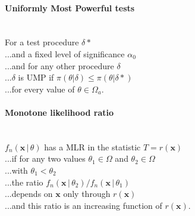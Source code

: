 \documentclass[10pt]{article}
\begin{document}
\paragraph{Uniformly Most Powerful tests}\ \\
For a test procedure $\delta *$\\
...and a fixed level of significance $\alpha_0$\\
...and for any other procedure $\delta$\\
...$\delta$ is UMP if $\pi(\theta | \delta) \leq \pi(\theta | \delta *)$\\
...for every value of $\theta \in \Omega_a$.

\paragraph{Monotone likelihood ratio}\ \\
$f_n(\boldsymbol{x}\,|\,\theta)$ has a MLR in the statistic $T = r(\boldsymbol{x})$\\
...if for any two values $\theta_1 \in \Omega$ and $\theta_2 \in \Omega$\\
...with $\theta_1 < \theta_2$\\
...the ratio $f_n(\boldsymbol{x}\,|\,\theta_2)/f_n(\boldsymbol{x}\,|\,\theta_1)$\\
...depends on $\boldsymbol{x}$ only through $r(\boldsymbol{x})$\\
...and this ratio is an increasing function of $r(\boldsymbol{x})$.
\end{document}
